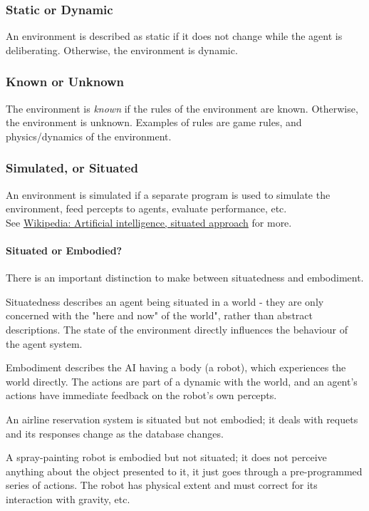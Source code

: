 \subsubsection{Static or Dynamic}
An environment is described as static if it does not change while the agent is
deliberating. Otherwise, the environment is dynamic.

\subsubsection{Known or Unknown}
The environment is \textit{known} if the rules of the environment are known.
Otherwise, the environment is unknown. Examples of rules are game rules, and
physics/dynamics of the environment.

\subsubsection{Simulated, or Situated}
An environment is simulated if a separate program is used to simulate the
environment, feed percepts to agents, evaluate performance, etc.\\
See
\href{http://en.wikipedia.org/wiki/Artificial_intelligence,_situated_approach}{Wikipedia:
Artificial intelligence, situated approach} for more.

\paragraph{Situated or Embodied?}
There is an important distinction to make between situatedness and
embodiment.

Situatedness describes an agent being situated in a world - they are only
concerned with the "here and now" of the world", rather than abstract
descriptions. The state of the environment directly influences the behaviour of
the agent system.

Embodiment describes the AI having a body (a robot), which experiences the
world directly. The actions are part of a dynamic with the world, and an
agent's actions have immediate feedback on the robot's own percepts.

An airline reservation system is situated but not embodied; it deals with
requets and its responses change as the database changes.

A spray-painting robot is embodied but not situated; it does not perceive
anything about the object presented to it, it just goes through a
pre-programmed series of actions. The robot has physical extent and must
correct for its interaction with gravity, etc.

